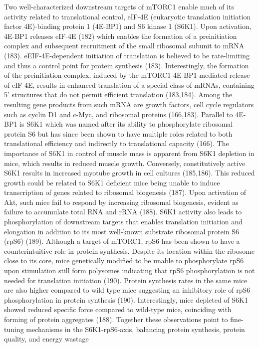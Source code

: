 \documentclass[twoside,10pt]{gihclass} %
\begin{document}
Two well-characterized downstream targets of mTORC1 enable much of its activity related to translational control, eIF-4E (eukaryotic translation initiation factor 4E)-binding protein 1 (4E-BP1) and S6 kinase 1 (S6K1).
Upon activation, 4E-BP1 releases eIF-4E
(182)
which enables the formation of a preinitiation complex and subsequent recruitment of the small ribosomal subunit to mRNA
(183).
eEIF-4E-dependent initiation of translation is believed to be rate-limiting and thus a control point for protein synthesis
(183).
Interestingly, the formation of the preinitiation complex, induced by the mTORC1-4E-BP1-mediated release of eIF-4E, results in enhanced translation of a special class of mRNAs, containing 5' structures that do not permit efficient translation
(183,184).
Among the resulting gene products from such mRNA are growth factors, cell cycle regulators such as cyclin D1 and c-Myc, and ribosomal proteins
(166,183).
Parallel to 4E-BP1 is S6K1 which was named after its ability to phosphorylate ribosomal protein S6 but has since been shown to have multiple roles related to both translational efficiency and indirectly to translational capacity
(166).
The importance of S6K1 in control of muscle mass is apparent from S6K1 depletion in mice, which results in reduced muscle growth. Conversely, constitutively active S6K1 results in increased myotube growth in cell cultures
(185,186).
This reduced growth could be related to S6K1 deficient mice being unable to induce transcription of genes related to ribosomal biogenesis
(187).
Upon activation of Akt, such mice fail to respond by increasing ribosomal biogenesis, evident as failure to accumulate total RNA and rRNA
(188).
S6K1 activity also leads to phosphorylation of downstream targets that enables translation initiation and elongation in addition to its most well-known substrate ribosomal protein S6 (rpS6)
(189).
Although a target of mTORC1, rpS6 has been shown to have a counterintuitive role in protein synthesis.
Despite its location within the ribosome close to its core, mice genetically modified to be unable to phosphorylate rpS6 upon stimulation still form polysomes indicating that rpS6 phosphorylation is not needed for translation initiation
(190).
Protein synthesis rates in the same mice are also higher compared to wild type mice suggesting an inhibitory role of rpS6 phosphorylation in protein synthesis
(190).
Interestingly, mice depleted of S6K1 showed reduced specific force compared to wild-type mice, coinciding with forming of protein aggregates
(188).
Together these observations point to fine-tuning mechanisms in the S6K1-rpS6-axis, balancing protein synthesis, protein quality, and energy wastage
\end{document}
